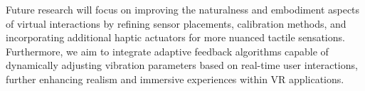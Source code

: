 \documentclass[graybox]{svmult}
\begin{document}
Future research will focus on improving the naturalness and embodiment aspects of virtual interactions by refining sensor placements, calibration methods, and incorporating additional haptic actuators for more nuanced tactile sensations. Furthermore, we aim to integrate adaptive feedback algorithms capable of dynamically adjusting vibration parameters based on real-time user interactions, further enhancing realism and immersive experiences within VR applications.



%
%
%
%

%


\end{document}
